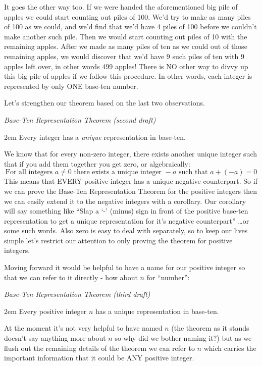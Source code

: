 \documentclass{article}
\newenvironment{jprIn}{\begin{adjustwidth}{2em}{}}{\end{adjustwidth}}
\begin{document}
It goes the other way too. If we were handed the aforementioned big
pile of apples we could start counting out
piles of 100. We'd try to make as many piles of 100 as we could,
and we'd find that we'd have 4 piles of 100 before
we couldn't make another such pile.
Then we would start counting out piles of 10 with the remaining apples.
After we made as many piles of ten as we could out of those remaining apples,
we would discover that we'd have 9 such piles of ten
with 9 apples left over, in other words 499 apples! There is NO other
way to divvy up this big pile of apples
if we follow this procedure.  In other words, each integer is
represented by only ONE base-ten number.

Let's strengthen our theorem based on the last two observations.

\emph{Base-Ten Representation Theorem (second draft)}
\begin{jprIn}
Every integer has a \emph{unique} representation in base-ten.
\end{jprIn}

\bigskip
We know that for every non-zero integer,
there exists another unique integer
such that if you add them together you get zero, or algebraically:
\[\text{For all integers }a\ne0\text{ there exists a unique integer }{-}a\text{ such that }a+(-a)=0\]
This means that EVERY positive integer has a unique negative counterpart.
So if we can prove the
Base-Ten Representation Theorem for the positive integers then we
can easily extend it to the negative integers with a corollary.
Our corollary will say something like ``Slap a `-' (minus)
sign in front of the positive base-ten representation to 
get a unique representation for
it's negative counterpart'' \dots{}or some such words.
Also zero is easy to deal with separately, so to keep our lives
simple let's restrict our attention to only proving the theorem for positive integers.

\bigskip
Moving forward it would be helpful to have a name for our 
positive integer so that we can refer to it directly - how about $n$ for ``number'':

\emph{Base-Ten Representation Theorem (third draft)}
\begin{jprIn}
Every positive integer $n$ has a unique representation in base-ten.
\end{jprIn}

At the moment it's not very helpful to have named $n$ (the theorem as it stands
doesn't say anything more about $n$ so why did we bother naming it?) but
as we flush out the remaining details of the theorem
we can refer to $n$ which carries the important information that it could be ANY positive integer.
\end{document}
